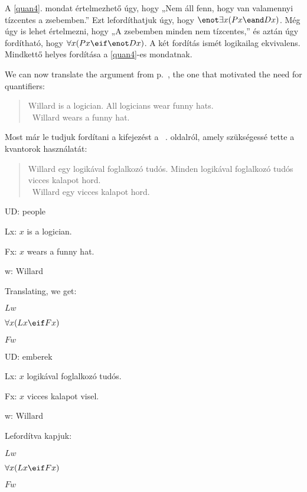 A \ref{quan4}. mondat értelmezhető úgy, hogy „Nem áll fenn, hogy van valamennyi tízcentes a zsebemben.” Ezt lefordíthatjuk úgy, hogy $\enot\exists x(Px \eand Dx)$. Még úgy is lehet értelmezni, hogy „A zsebemben minden nem tízcentes,” és aztán úgy fordítható, hogy $\forall x(Px \eif \enot Dx)$. A két fordítás ismét logikailag ekvivalens. Mindkettő helyes fordítása a \ref{quan4}-es mondatnak.

We can now translate the argument from p.~\pageref{willard1}, the one that motivated the need for quantifiers:
\begin{quote}
Willard is a logician. All logicians wear funny hats.\\
\therefore\ Willard wears a funny hat.
\end{quote}

Most már le tudjuk fordítani a kifejezést a ~\pageref{willard1}. oldalról, amely szükségessé tette a kvantorok használatát:
\begin{quote}
Willard egy logikával foglalkozó tudós. Minden logikával foglalkozó tudós vicces kalapot hord.\\
\therefore\ Willard egy vicces kalapot hord.
\end{quote}



\begin{ekey}
\item[UD:] people
\item[Lx:] $x$ is a logician.
\item[Fx:] $x$ wears a funny hat.
\item[w:] Willard
\end{ekey}
Translating, we get:
\begin{earg}
\item[] $Lw$
\item[] $\forall x(Lx \eif Fx)$
\item[\therefore] $Fw$
\end{earg}

\begin{ekey}
\item[UD:] emberek
\item[Lx:] $x$ logikával foglalkozó tudós.
\item[Fx:] $x$ vicces kalapot visel.
\item[w:] Willard
\end{ekey}
Lefordítva kapjuk:
\begin{earg}
\item[] $Lw$
\item[] $\forall x(Lx \eif Fx)$
\item[\therefore] $Fw$
\end{earg}

